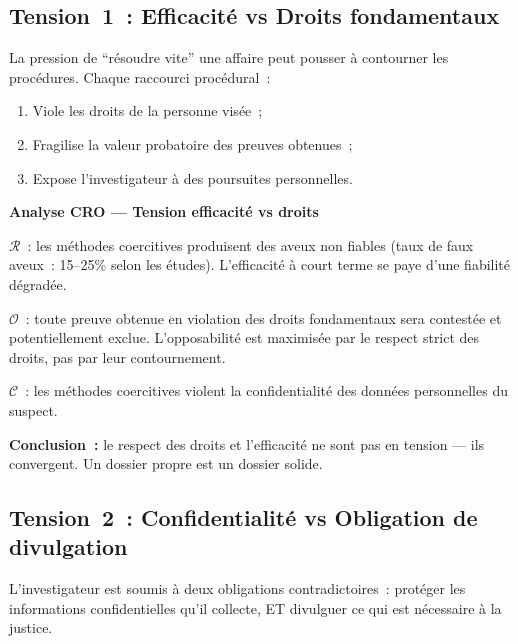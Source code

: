 \subsection{Tension~1~: Efficacité vs Droits fondamentaux}

La pression de ``résoudre vite'' une affaire peut pousser à contourner
les procédures. Chaque raccourci procédural~:
\begin{enumerate}
    \item Viole les droits de la personne visée~;
    \item Fragilise la valeur probatoire des preuves obtenues~;
    \item Expose l'investigateur à des poursuites personnelles.
\end{enumerate}

\begin{boxCRO}
\textbf{Analyse CRO --- Tension efficacité vs droits}

$\mathcal{R}$~: les méthodes coercitives produisent des aveux non fiables
(taux de faux aveux~: 15--25\% selon les études). L'efficacité à court
terme se paye d'une fiabilité dégradée.

$\mathcal{O}$~: toute preuve obtenue en violation des droits fondamentaux
sera contestée et potentiellement exclue. L'opposabilité est maximisée
par le respect strict des droits, pas par leur contournement.

$\mathcal{C}$~: les méthodes coercitives violent la confidentialité
des données personnelles du suspect.


\textbf{Conclusion~:} le respect des droits et l'efficacité ne sont
pas en tension --- ils convergent. Un dossier propre est un dossier solide.
\end{boxCRO}

\subsection{Tension~2~: Confidentialité vs Obligation de divulgation}

L'investigateur est soumis à deux obligations contradictoires~:
protéger les informations confidentielles qu'il collecte, ET divulguer
ce qui est nécessaire à la justice.

